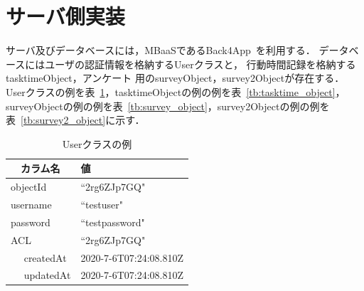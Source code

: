 \section{サーバ側実装}
サーバ及びデータベースには，MBaaSであるBack4App~\cite{back4app}を利用する．
データベースにはユーザの認証情報を格納するUserクラスと， 行動時間記録を格納するtasktimeObject，アンケート 用のsurveyObject，survey2Objectが存在する．
Userクラスの例を表~\ref{tb:user_class}，tasktimeObjectの例の例を表~\ref{tb:tasktime_object}，surveyObjectの例の例を表~\ref{tb:survey_object}，survey2Objectの例の例を表~\ref{tb:survey2_object}に示す．

\begin{table}[htb]
\begin{center}
  \begin{tabular}{|l|l|} \hline
 　カラム名 & 値 \\ \hline
    objectId & ``2rg6ZJp7GQ" \\
    username & ``testuser" \\
    password & ``testpassword" \\
    ACL & ``2rg6ZJp7GQ" \\
　 createdAt & 2020-7-6T07:24:08.810Z  \\
　 updatedAt & 2020-7-6T07:24:08.810Z \\ \hline 
  \end{tabular}
  \caption{Userクラスの例}
  \label{tb:user_class}
\end{center}
\end{table}

